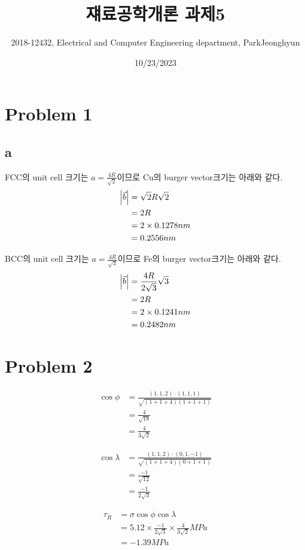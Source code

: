 \documentclass[a4paper]{oblivoir}
\title{쟤료공학개론 과제5}
\author{2018-12432, Electrical and Computer Engineering department, ParkJeonghyun}
\date{10/23/2023}
\begin{document}
\maketitle
\section{Problem 1}
\subsection{a}
FCC의 unit cell 크기는 $a = \frac{4R}{\sqrt{2}}$이므로 Cu의 burger vector크기는 아래와 같다.
\begin{align}
	\abs{\vec{b}} &= \sqrt{2}R\sqrt{2}\\
	&= 2R\\
	&= 2\times 0.1278 nm\\
	&= 0.2556nm
\end{align}

BCC의 unit cell 크기는 $a = \frac{4R}{\sqrt{3}}$이므로 Fe의 burger vector크기는 아래와 같다.
\begin{align}
	\abs{\vec{b}} &= \frac{4R}{2\sqrt{3}}\sqrt{3}\\
	&= 2R\\
	&= 2\times 0.1241 nm\\
	&= 0.2482nm
\end{align}

\section{Problem 2}
\begin{align}
	\cos\phi &= \frac{(1,1,2)\cdot(1,1,1)}{\sqrt{(1+1+4)(1+1+1)}}\\
	&= \frac{4}{\sqrt{18}}\\
	&= \frac{4}{3\sqrt{2}}
\end{align}

\begin{align}
	\cos\lambda &= \frac{(1,1,2)\cdot(0,1,-1)}{\sqrt{(1+1+4)(0+1+1)}}\\
	&= \frac{-1}{\sqrt{12}}\\
	&= \frac{-1}{2\sqrt{3}}
\end{align}

\begin{align}
	\tau_{R} &= \sigma \cos \phi \cos \lambda\\
	&= 5.12\times\frac{-1}{2\sqrt{3}}\times \frac{4}{3\sqrt{2}} MPa\\
	&= -1.39 MPa
\end{align}
\end{document}
